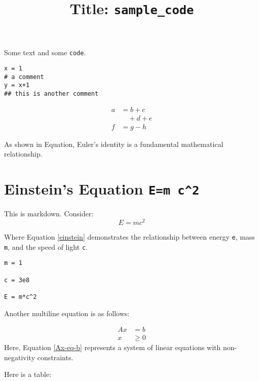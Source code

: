 \documentclass{article}
\title{Title: \texttt{sample\_code}}
\begin{document}
\maketitle


Some text and some \texttt{code}.

\begin{verbatim}
x = 1
# a comment
y = x+1
## this is another comment
\end{verbatim}


\begin{equation*}
\begin{aligned}
  a &= b + c \\
  & \quad + d + e \\
  f &= g - h
\end{aligned}
\end{equation*}



As shown in Equation, Euler's identity is a fundamental mathematical relationship.
\section{Einstein's Equation \texttt{E=m c\textasciicircum{}2}}
This is markdown. Consider: 
\begin{equation}\label{einstein}
E = mc^2
\end{equation}

Where Equation \eqref{einstein} demonstrates the relationship between energy \texttt{e}, mass \texttt{m}, and the speed of light \texttt{c}.

\begin{verbatim}
m = 1

c = 3e8

E = m*c^2
\end{verbatim}


Another multiline equation is as follows: 

\begin{equation}\label{Ax-eq-b}
\begin{aligned}
  Ax &= b \\
  x &\ge 0
\end{aligned}
\end{equation}
Here, Equation \eqref{Ax-eq-b} represents a system of linear equations with non-negativity constraints.

Here is a table:
\end{document}
